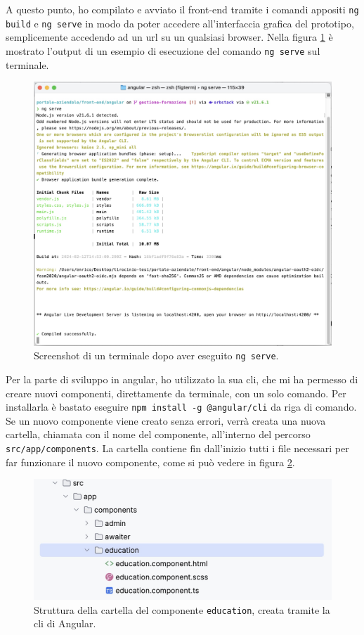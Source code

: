A questo punto, ho compilato e avviato il front-end tramite i comandi appositi \texttt{ng build} e \texttt{ng serve} in modo da poter accedere all'interfaccia grafica del prototipo, semplicemente accedendo ad un \acrshort{url} su un qualsiasi browser. Nella figura \ref{fig:ng serve} è mostrato l'output di un esempio di esecuzione del comando \texttt{ng serve} sul terminale.
\begin{figure}{}
\centering
\includegraphics[width=.8\textwidth]{Images/ng serve.jpg}
\caption{\label{fig:ng serve}Screenshot di un terminale dopo aver eseguito \texttt{ng serve}.}
\end{figure}

Per la parte di sviluppo in \gls{angular}, ho utilizzato la sua \acrshort{cli}, che mi ha permesso di creare nuovi componenti, direttamente da terminale, con un solo comando. Per installarla è bastato eseguire \texttt{npm install -g @angular/cli} da riga di comando.
Se un nuovo componente viene creato senza errori, verrà creata una nuova cartella, chiamata con il nome del componente, all'interno del percorso \texttt{src/app/components}.
La cartella contiene fin dall'inizio tutti i file necessari per far funzionare il nuovo componente, come si può vedere in figura \ref{fig:education}.
\begin{figure}[H]
\centering
\includegraphics[width=1\textwidth]{Images/education.jpg}
\caption{\label{fig:education}Struttura della cartella del componente \texttt{education}, creata tramite la \acrshort{cli} di Angular.}
\end{figure}

